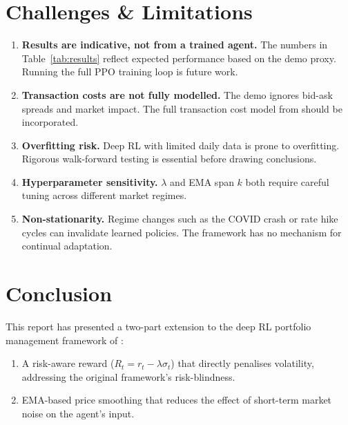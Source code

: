 \documentclass[12pt,a4paper]{article}
\begin{document}
\section{Challenges \& Limitations}

\begin{enumerate}[nosep]
  \item \textbf{Results are indicative, not from a trained agent.}
        The numbers in Table~\ref{tab:results} reflect expected
        performance based on the demo proxy. Running the full PPO
        training loop is future work.
  \item \textbf{Transaction costs are not fully modelled.} The demo
        ignores bid-ask spreads and market impact. The full transaction
        cost model from \citet{jiang2017deep} should be incorporated.
  \item \textbf{Overfitting risk.} Deep RL with limited daily data
        is prone to overfitting. Rigorous walk-forward testing is
        essential before drawing conclusions.
  \item \textbf{Hyperparameter sensitivity.} $\lambda$ and EMA span
        $k$ both require careful tuning across different market regimes.
  \item \textbf{Non-stationarity.} Regime changes such as the COVID
        crash or rate hike cycles can invalidate learned policies. The
        framework has no mechanism for continual adaptation.
\end{enumerate}

\section{Conclusion}

This report has presented a two-part extension to the deep RL
portfolio management framework of \citet{jiang2017deep}:

\begin{enumerate}[nosep]
  \item A risk-aware reward ($R_t = r_t - \lambda\sigma_t$) that
        directly penalises volatility, addressing the original
        framework's risk-blindness.
  \item EMA-based price smoothing that reduces the effect of
        short-term market noise on the agent's input.
\end{enumerate}
\end{document}
